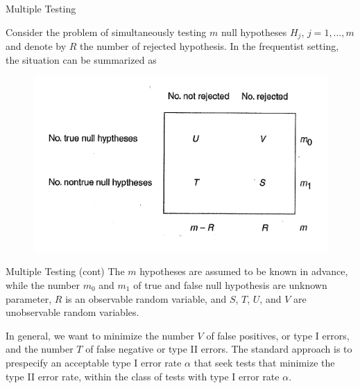 \documentclass{beamer}
\begin{document}
\begin{frame}{Multiple Testing}
	
	Consider the problem of simultaneously testing $m$ null hypotheses $H_j$, $j=1,\ldots, m$ and denote by $R$ the
	number of rejected hypothesis. In the frequentist setting, the situation can be summarized as 
	
	\begin{figure}[h]
		\centering
		\includegraphics[scale=0.8]{../../Figures/fig_fdr_table.png}
	\end{figure}
\end{frame}

\begin{frame}{Multiple Testing (cont)}	
	The $m$ hypotheses are assumed to be known in advance, while the number $m_0$ and $m_1$ of true and false null hypothesis are unknown parameter, $R$ is an observable random variable, and $S$, $T$, $U$, and $V$ are unobservable random variables. 
	
	In general, we want to minimize the number $V$ of false positives, or type I errors, and the number $T$ of false negative or type II errors. The standard approach is to prespecify an acceptable type I error rate $\alpha$ that seek tests that minimize the type II error rate, within the class of tests with type I error rate $\alpha$. 
	

\end{frame}
\end{document}

